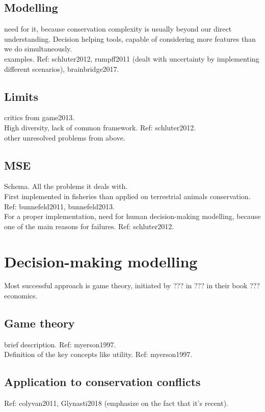 \documentclass[12pt,a4paper]{article}
\begin{document}
\subsection{Modelling}

need for it, because conservation complexity is usually beyond our direct understanding. Decision helping tools, capable of considering more features than we do simultaneously.\\
examples. Ref: schluter2012, rumpff2011 (dealt with uncertainty by implementing different scenarios), brainbridge2017.

\subsection{Limits}

critics from game2013.\\
High diversity, lack of common framework. Ref: schluter2012.\\
other unresolved problems from above.

\subsection{MSE}

Schema.
All the problems it deals with. \\
First implemented in fisheries than applied on terrestrial animals conservation. Ref: bunnefeld2011, bunnefeld2013.\\

For a proper implementation, need for human decision-making modelling, because one of the main reasons for failures. Ref: schluter2012.

\section{Decision-making modelling}

Most successful approach is game theory, initiated by ??? in ??? in their book ??? economics.

\subsection{Game theory}
brief description. Ref: myerson1997.\\
Definition of the key concepts like utility. Ref: myerson1997.

\subsection{Application to conservation conflicts}
Ref: colyvan2011, Glynasti2018 (emphasize on the fact that it's recent).\\
\end{document}
